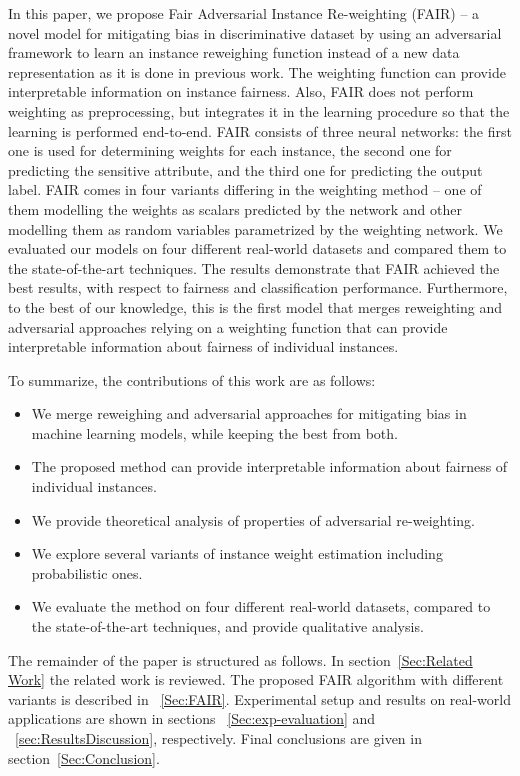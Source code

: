 \documentclass[preprint,12pt]{elsarticle}
\begin{document}
In this paper, we propose Fair Adversarial Instance Re-weighting (FAIR) -- a novel model for mitigating bias in discriminative dataset by using an adversarial framework to learn an instance reweighing function instead of a new data representation as it is done in previous work. The weighting function can provide interpretable information on instance fairness. Also, FAIR does not perform weighting as preprocessing, but integrates it in the learning procedure so that the learning is performed end-to-end. FAIR consists of three neural networks: the first one is used for determining weights for each instance, the second one for predicting the sensitive attribute, and the third one for predicting the output label. FAIR comes in four variants differing in the weighting method -- one of them modelling the weights as scalars predicted by the network and other modelling them as random variables parametrized by the weighting network. We evaluated our models on four different real-world datasets and compared them to the state-of-the-art techniques. The results demonstrate that FAIR achieved the best results, with respect to fairness and classification performance. Furthermore, to the best of our knowledge, this is the first model that merges reweighting and adversarial approaches relying on a weighting function that can provide interpretable information about fairness of individual instances.

To summarize, the contributions of this work are as follows:
\begin{itemize}
	\item We merge reweighing and adversarial approaches for mitigating bias in machine learning models, while keeping the best from both.
	\item The proposed method can provide interpretable information about fairness of individual instances.
	\item We provide theoretical analysis of properties of adversarial re-weighting.
	\item We explore several variants of instance weight estimation including probabilistic ones.
	\item We evaluate the method on four different real-world datasets, compared to the state-of-the-art techniques, and provide qualitative analysis.
\end{itemize}

The remainder of the paper is structured as follows. In section~\ref{Sec:Related Work} the related work is reviewed. 
The proposed FAIR algorithm with different variants is described in ~\ref{Sec:FAIR}.
Experimental setup and results on real-world applications are shown in sections ~\ref{Sec:exp-evaluation} and ~\ref{sec:ResultsDiscussion}, respectively. Final conclusions are given in section~\ref{Sec:Conclusion}.
\end{document}
